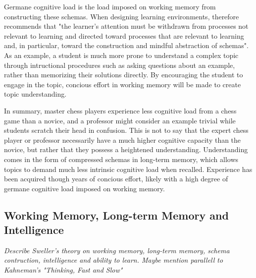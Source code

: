 Germane cognitive load is the load imposed on working memory from constructing these schemas. When designing learning environments, \textcite{sweller1988} therefore recommends that "the learner's attention must be withdrawn from processes not relevant to learning and directed toward processes that are relevant to learning and, in particular, toward the construction and mindful abstraction of schemas". As an example, a student is much more prone to understand a complex topic through intructional procedures such as asking questions about an example, rather than memorizing their solutions directly. By encouraging the student to engage in the topic, concious effort in working memory will be made to create topic understanding. 

In summary, master chess players experience less cognitive load from a chess game than a novice, and a professor might consider an example trivial while students scratch their head in confusion. This is not to say that the expert chess player or professor necessarily have a much higher cognitive capacity than the novice, but rather that they possess a heightened understanding. Understanding comes in the form of compressed schemas in long-term memory, which allows topics to demand much less intrinsic cognitive load when recalled. Experience has been acquired though years of concious effort, likely with a high degree of germane cognitive load imposed on working memory.

\subsection{Working Memory, Long-term Memory and Intelligence}
\textit{Describe Sweller's theory on working memory, long-term memory, schema contruction, intelligence and ability to learn. Maybe mention parallell to Kahneman's "Thinking, Fast and Slow"}

\FloatBarrier